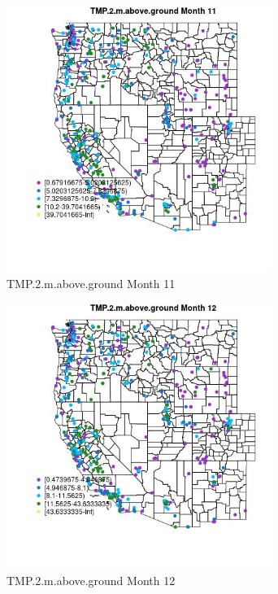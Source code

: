 \begin{figure} 
\centering  
\includegraphics[width=0.77\textwidth]{Code_Outputs/ML_input_report_ML_input_PM25_Step5_part_d_de_duplicated_aves_ML_input_MapObsMo11TMP2maboveground.jpg} 
\caption{\label{fig:ML_input_report_ML_input_PM25_Step5_part_d_de_duplicated_aves_ML_inputMapObsMo11TMP2maboveground}TMP.2.m.above.ground Month 11} 
\end{figure} 
 

\begin{figure} 
\centering  
\includegraphics[width=0.77\textwidth]{Code_Outputs/ML_input_report_ML_input_PM25_Step5_part_d_de_duplicated_aves_ML_input_MapObsMo12TMP2maboveground.jpg} 
\caption{\label{fig:ML_input_report_ML_input_PM25_Step5_part_d_de_duplicated_aves_ML_inputMapObsMo12TMP2maboveground}TMP.2.m.above.ground Month 12} 
\end{figure} 
 

